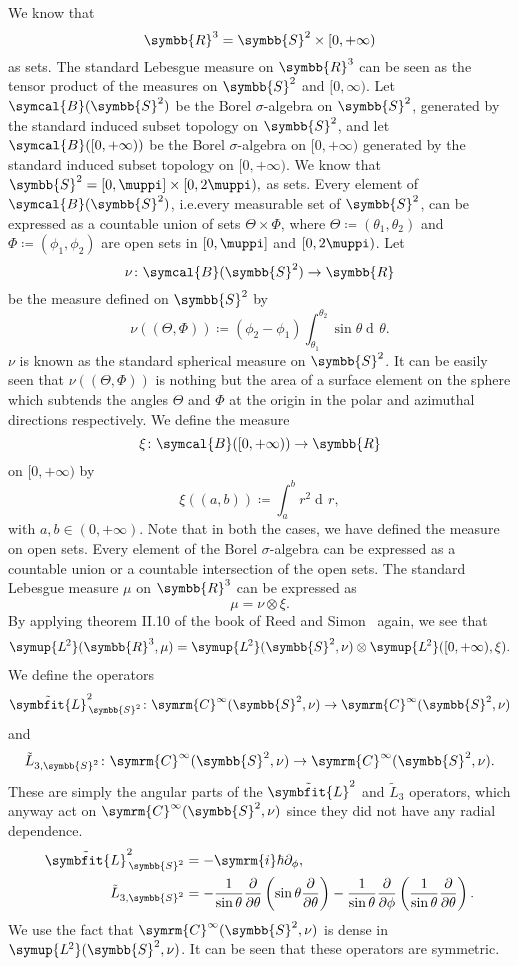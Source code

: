 \documentclass[12pt, a4 paper]{article}
\theoremstyle{definition}
\newcommand{\ltwo}{\symup{L\kern-0.5pt^2}}
\newcommand{\rthree}{\symbb{R}^3}
\newcommand{\rr}{\symbb{R}}
\renewcommand{\i}{\symrm{i}}
\renewcommand{\pi}{\muppi}
\newcommand{\lvecsquare}{\tilde{\symbfit{L}}^2}
\newcommand{\der}{\operatorname{d\!}{}}
\begin{document}
    We know that \[\rthree = \symbb{S}^2 \times [0, +\infty)\] as sets. The standard Lebesgue measure on $\rthree$ can be seen as the tensor product of the measures on $\symbb{S}^2$ and $[0, \infty)$. Let $\symcal{B}(\symbb{S}^2)$ be the Borel $\sigma$-algebra on $\symbb{S}^2$, generated by the standard induced subset topology on $\symbb{S}^2$, and let $\symcal{B}([0,+\infty))$ be the Borel $\sigma$-algebra on $[0, +\infty)$ generated by the standard induced subset topology on $[0, +\infty)$. We know that $\symbb{S}^2 = [0, \pi] \times [0, 2\pi),$ as sets. Every element of $\symcal{B}(\symbb{S}^2)$, i.e.\@ every measurable set of $\symbb{S}^2$, can be expressed as a countable union of sets $\Theta \times \Phi$, where $\Theta \coloneq (\theta_1, \theta_2)$ and $\Phi \coloneq (\phi_1, \phi_2)$ are open sets in $[0, \pi]$ and $[0, 2\pi)$. Let
    \[
        \nu \colon \symcal{B}(\symbb{S}^2) \rightarrow \rr
    \]
    be the measure defined on $\symbb{S}^2$ by
    \[
        \nu((\Theta, \Phi)) \coloneq (\phi_2 - \phi_1) \int_{\theta_1}^{\theta_2}\sin{\theta}\der \theta.
    \]
    $\nu$ is known as the standard spherical measure on $\symbb{S}^2$. It can be easily seen that $\nu((\Theta, \Phi))$ is nothing but the area of a surface element on the sphere which subtends the angles $\Theta$ and $\Phi$ at the origin in the polar and azimuthal directions respectively. We define the measure
    \[
        \xi \colon \symcal{B}([0, +\infty)) \rightarrow \rr
    \]
    on $[0, +\infty)$ by
    \[
        \xi((a, b)) \coloneq \int_a^b r^2\! \der r,
    \]
    with $a, b \in (0, +\infty)$. Note that in both the cases, we have defined the measure on open sets. Every element of the Borel $\sigma$-algebra can be expressed as a countable union or a countable intersection of the open sets. The standard Lebesgue measure $\mu$ on $\rthree$ can be expressed as
    \[
        \mu = \nu \otimes \xi.
    \]
    By applying theorem II.10 of the book of Reed and Simon~\cite[p.~52]{Reed} again, we see that
    \begin{align}
        \ltwo(\rthree, \mu) = \ltwo(\symbb{S}^2, \nu) \otimes \ltwo([0, +\infty), \xi).
    \end{align}
    We define the operators \[\lvecsquare_{\,\symbb{S}^2} \colon \symrm{C}^\infty(\symbb{S}^2, \nu) \rightarrow \symrm{C}^\infty(\symbb{S}^2, \nu)\] and \[\tilde{L}_{3, \symbb{S}^2} \colon \symrm{C}^\infty(\symbb{S}^2, \nu) \rightarrow \symrm{C}^\infty(\symbb{S}^2, \nu).\] These are simply the angular parts of the $\lvecsquare$ and $\tilde{L}_3$ operators, which anyway act on $\symrm{C}^\infty(\symbb{S}^2, \nu)$ since they did not have any radial dependence.
    \begin{align*}
        \lvecsquare_{\,\symbb{S}^2} &= -\i\hbar\partial_\phi,\\
        \tilde{L}_{3, \symbb{S}^2}  &= -\frac{1}{\sin{\theta}}\frac{\partial}{\partial \theta}\left(\sin{\theta}\frac{\partial}{\partial\theta}\right) -\frac{1}{\sin{\theta}}\frac{\partial}{\partial\phi}\left(\frac{1}{\sin{\theta}}\frac{\partial}{\partial\theta}\right).
    \end{align*}
    We use the fact that $\symrm{C}^\infty(\symbb{S}^2, \nu)$ is dense in $\ltwo(\symbb{S}^2, \nu)$. It can be seen that these operators are symmetric.
\end{document}
